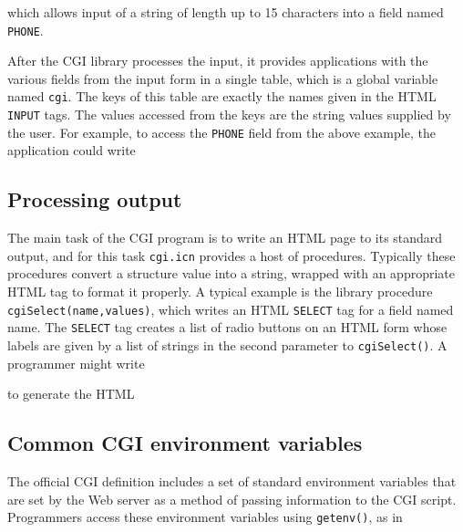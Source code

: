 
\noindent
which allows input of a string of length up to 15 characters into a
field named \texttt{PHONE}.

After the CGI library processes the input, it provides applications with
the various fields from the input form in a single table, which is a
global variable named \texttt{cgi}. The keys of this table are exactly
the names given in the HTML \texttt{INPUT} tags. The values accessed
from the keys are the string values supplied by the user. For example,
to access the \texttt{PHONE} field from the above example, the
application could write 


\subsection*{Processing output}

The main task of the CGI program is to write an HTML page to its
standard output, and for this task \texttt{cgi.icn} provides a host of
procedures. Typically these procedures convert a structure value into a
string, wrapped with an appropriate HTML tag to format it properly. A
typical example is the library procedure
\texttt{cgiSelect(name,values)}, which writes an HTML \texttt{SELECT}
tag for a field named name. The \texttt{SELECT} tag creates a list of
radio buttons on an HTML form whose labels are given by a list of
strings in the second parameter to \texttt{cgiSelect()}. A programmer
might write


\noindent to generate the HTML


\subsection*{Common CGI environment variables}

The official CGI definition includes a set
of standard environment
variables that are set by the Web server as a method of passing
information to the CGI script. Programmers access these environment
variables using \texttt{getenv()}, as in

